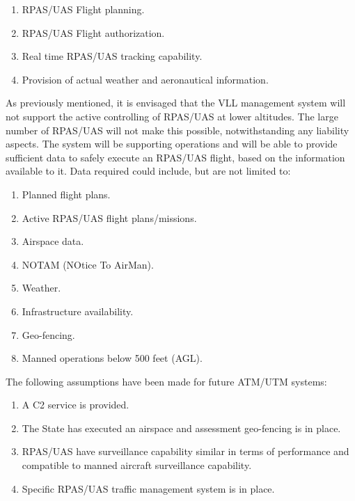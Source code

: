\begin{enumerate}
    \item  RPAS/UAS Flight planning.
    
    \item  RPAS/UAS Flight authorization.
    
    \item  Real time RPAS/UAS tracking capability.
    
    \item  Provision of actual weather and aeronautical information.
\end{enumerate}

\noindent As previously mentioned, it is envisaged that the VLL management system will not support the active controlling of RPAS/UAS at lower altitudes. The large number of RPAS/UAS will not make this possible, notwithstanding any liability aspects. The system will be supporting operations and will be able to provide sufficient data to safely execute an RPAS/UAS flight, based on the information available to it. Data required could include, but are not limited to:

\begin{enumerate}
    \item Planned flight plans.

    \item Active RPAS/UAS flight plans/missions.

    \item Airspace data.

    \item NOTAM (NOtice To AirMan).
    
    \item Weather.

    \item Infrastructure availability.

    \item Geo-fencing.

    \item Manned operations below 500 feet (AGL).
\end{enumerate}



\noindent The following assumptions have been made for future ATM/UTM systems:
\begin{enumerate}
    \item A C2 service is provided.

    \item The State has executed an airspace and assessment geo-fencing is in place.
    
    \item  RPAS/UAS have surveillance capability similar in terms of performance and compatible to manned aircraft surveillance capability.
    
    \item  Specific RPAS/UAS traffic management system is in place.
\end{enumerate}

